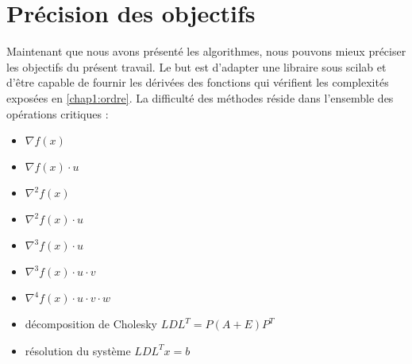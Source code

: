 




% 
% 
% 
% 
% 
% 
% 





\section{Pr\'ecision des objectifs}
Maintenant que nous avons pr\'esent\'e les algorithmes, nous pouvons mieux pr\'eciser les objectifs du pr\'esent travail.
Le but est d'adapter une libraire sous scilab et d'être capable de fournir les d\'eriv\'ees des fonctions qui v\'erifient
les complexit\'es expos\'ees en \ref{chap1:ordre}.
La difficult\'e des m\'ethodes r\'eside dans l'ensemble des op\'erations critiques : 
\begin{itemize}
\item $\nabla f(x)$
\item $\nabla f(x)\cdot u$
\item $\nabla^2 f(x)$
\item $\nabla^2 f(x)\cdot u$
\item $\nabla^3 f(x)\cdot u$
\item $\nabla^3 f(x)\cdot u\cdot v$
\item $\nabla^4 f(x)\cdot u\cdot v \cdot w$
\item d\'ecomposition de Cholesky $LDL^T = P(A+E)P^T$
\item r\'esolution du syst\`eme $LDL^Tx =b$
\end{itemize}


